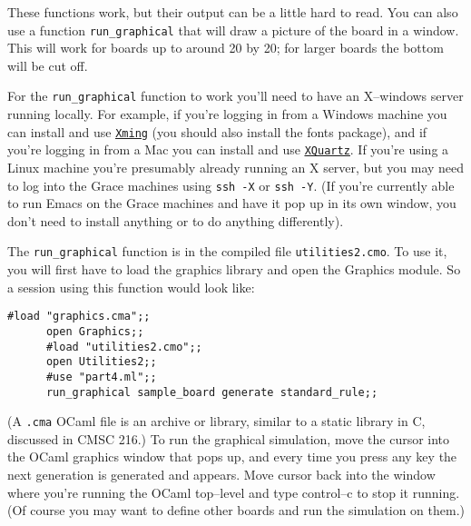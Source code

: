 \documentclass[11pt]{article}
\begin{document}
    These functions work, but their output can be a little hard to read.  You
  can also use a function \texttt{run\_graphical} that will draw a picture
  of the board in a window.  This will work for boards up to around 20 by
  20; for larger boards the bottom will be cut off.

    For the \texttt{run\_graphical} function to work you'll need to have an
  X--windows server running locally.  For example, if you're logging in from
  a Windows machine you can install and use
    \href{http://www.straightrunning.com/XmingNotes}
         {\texttt{\underline{Xming}}}
  (you should also install the fonts package), and if you're logging in from
  a Mac you can install and use
    \href{http://xquartz.macosforge.org/landing/}
         {\texttt{\underline{XQuartz}}}.
  If you're using a Linux machine you're presumably already running an X
  server, but you may need to log into the Grace machines using \texttt{ssh
  -X} or \texttt{ssh -Y}.  (If you're currently able to run Emacs on the
  Grace machines and have it pop up in its own window, you don't need to
  install anything or to do anything differently).

    The \texttt{run\_graphical} function is in the compiled file
  \texttt{utilities2.cmo}.  To use it, you will first have to load the
  graphics library and open the Graphics module.  So a session using this
  function would look like:

    \vspace{-2mm}

    \begin{center}

      \begin{BVerbatim}[gobble=6]
      #load "graphics.cma";;
      open Graphics;;
      #load "utilities2.cmo";;
      open Utilities2;;
      #use "part4.ml";;
      run_graphical sample_board generate standard_rule;;
      \end{BVerbatim}

    \end{center}

    \vspace{-2mm}

    (A \texttt{.cma} OCaml file is an archive or library, similar to a static
  library in C, discussed in CMSC 216.)  To run the graphical simulation,
  move the cursor into the OCaml graphics window that pops up, and every
  time you press any key the next generation is generated and appears.  Move
  cursor back into the window where you're running the OCaml top--level and
  type control--c to stop it running.  (Of course you may want to define
  other boards and run the simulation on them.)
\end{document}

